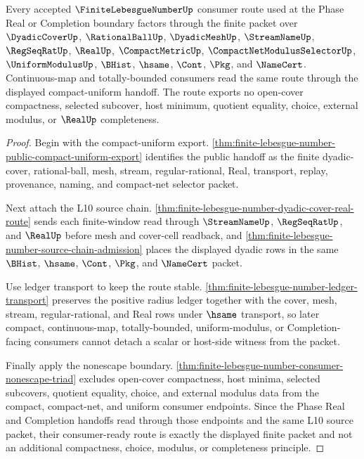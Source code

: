 \begin{theorem}
\label{thm:finite-lebesgue-number-l10-phase-consumer-readiness}
Every accepted $\FiniteLebesgueNumberUp$ consumer route used at the Phase Real or Completion boundary factors through the finite packet over $\DyadicCoverUp$, $\RationalBallUp$, $\DyadicMeshUp$, $\StreamNameUp$, $\RegSeqRatUp$, $\RealUp$, $\CompactMetricUp$, $\CompactNetModulusSelectorUp$, $\UniformModulusUp$, $\BHist$, $\hsame$, $\Cont$, $\Pkg$, and $\NameCert$. Continuous-map and totally-bounded consumers read the same route through the displayed compact-uniform handoff. The route exports no open-cover compactness, selected subcover, host minimum, quotient equality, choice, external modulus, or $\RealUp$ completeness.
\end{theorem}
\begin{proof}
Begin with the compact-uniform export. \autoref{thm:finite-lebesgue-number-public-compact-uniform-export} identifies the public handoff as the finite dyadic-cover, rational-ball, mesh, stream, regular-rational, Real, transport, replay, provenance, naming, and compact-net selector packet.

Next attach the L10 source chain. \autoref{thm:finite-lebesgue-number-dyadic-cover-real-route} sends each finite-window read through $\StreamNameUp$, $\RegSeqRatUp$, and $\RealUp$ before mesh and cover-cell readback, and \autoref{thm:finite-lebesgue-number-source-chain-admission} places the displayed dyadic rows in the same $\BHist$, $\hsame$, $\Cont$, $\Pkg$, and $\NameCert$ packet.

Use ledger transport to keep the route stable. \autoref{thm:finite-lebesgue-number-ledger-transport} preserves the positive radius ledger together with the cover, mesh, stream, regular-rational, and Real rows under $\hsame$ transport, so later compact, continuous-map, totally-bounded, uniform-modulus, or Completion-facing consumers cannot detach a scalar or host-side witness from the packet.

Finally apply the nonescape boundary. \autoref{thm:finite-lebesgue-number-consumer-nonescape-triad} excludes open-cover compactness, host minima, selected subcovers, quotient equality, choice, and external modulus data from the compact, compact-net, and uniform consumer endpoints. Since the Phase Real and Completion handoffs read through those endpoints and the same L10 source packet, their consumer-ready route is exactly the displayed finite packet and not an additional compactness, choice, modulus, or completeness principle.
\end{proof}

